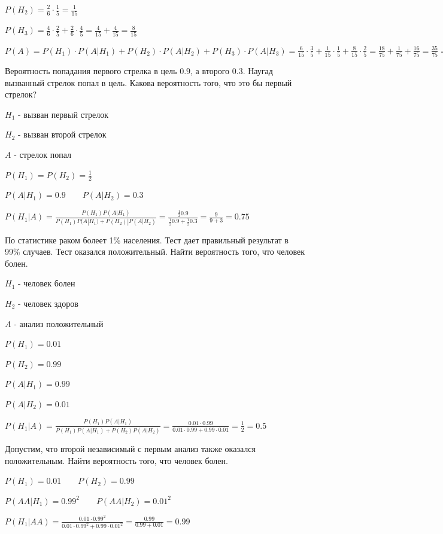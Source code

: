 \documentclass[12pt]{article}
\begin{document}
    $P(H_2) = \frac{2}{6} \cdot \frac{1}{5} = \frac{1}{15}$

    $P(H_3) = \frac{4}{6} \cdot \frac{2}{5} + \frac{2}{6} \cdot \frac{4}{5} = \frac{4}{15} + \frac{4}{15} = \frac{8}{15}$

    $P(A) = P(H_1) \cdot P(A|H_1) + P(H_2) \cdot P(A|H_2) + P(H_3) \cdot P(A|H_3) = \frac{6}{15} \cdot \frac{3}{5} + \frac{1}{15} \cdot \frac{1}{5} + \frac{8}{15} \cdot \frac{2}{5} =
    \frac{18}{75} + \frac{1}{75} + \frac{16}{75} = \frac{35}{75} = \frac{7}{15}$

     Вероятность попадания первого стрелка в цель $0.9$, а второго $0.3$. Наугад вызванный стрелок попал в цель. Какова вероятность того, что это бы первый стрелок?

    $H_1$ - вызван первый стрелок

    $H_2$ - вызван второй стрелок

    $A$ - стрелок попал

    $P(H_1) = P(H_2) = \frac{1}{2}$

    $P(A|H_1) = 0.9 \quad\quad P(A|H_2) = 0.3$

    $P(H_1 | A) = \frac{P(H_1) P(A|H_1)}{P(H_1) P(A|H_1) + P(H_2) | P(A | H_2)} = \frac{\frac{1}{2} 0.9}{\frac{1}{2} 0.9 + \frac{1}{2} 0.3} = \frac{9}{9 + 3} = 0.75$

     По статистике раком болеет 1\% населения. Тест дает правильный результат в 99\% случаев. Тест оказался положительный. Найти вероятность того, что человек болен.

    $H_1$ - человек болен

    $H_2$ - человек здоров

    $A$ - анализ положительный

    $P(H_1) = 0.01$

    $P(H_2) = 0.99$

    $P(A|H_1) = 0.99$

    $P(A|H_2) = 0.01$

    $P(H_1 | A) = \frac{P(H_1)P(A | H_1)}{P(H_1) P(A | H_1) + P(H_2) P(A | H_2)} = \frac{0.01 \cdot 0.99}{0.01 \cdot 0.99 + 0.99 \cdot 0.01} = \frac{1}{2} = 0.5$

    Допустим, что второй независимый с первым анализ также оказался положительным. Найти вероятность того, что человек болен.

    $P(H_1) = 0.01 \quad\quad P(H_2) = 0.99$

    $P(AA|H_1) = 0.99^2 \quad\quad P(AA|H_2) = 0.01^2$

    $P(H_1 | AA) = \frac{0.01 \cdot 0.99^2}{0.01 \cdot 0.99^2 + 0.99 \cdot 0.01^2} = \frac{0.99}{0.99 + 0.01} = 0.99$
\end{document}
